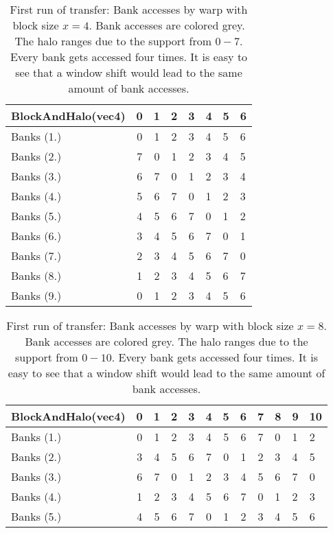 \documentclass[m,times]{cgMA}
\begin{document}
\begin{appendices}
\begin{table}[htpb]
  \begin{tabular}{ | l | a | a | a | a | l | l | l |}\hline
    BlockAndHalo(vec4) & 0 & 1 & 2 & 3 & 4 & 5 & 6 \\\hline
    Banks (1.) & 0 & 1 & 2 & 3 & 4 & 5 & 6 \\\hline
    Banks (2.) & 7 & 0 & 1 & 2 & 3 & 4 & 5 \\\hline
    Banks (3.) & 6 & 7 & 0 & 1 & 2 & 3 & 4 \\\hline
    Banks (4.) & 5 & 6 & 7 & 0 & 1 & 2 & 3 \\\hline
    Banks (5.) & 4 & 5 & 6 & 7 & 0 & 1 & 2 \\\hline
    Banks (6.) & 3 & 4 & 5 & 6 & 7 & 0 & 1 \\\hline
    Banks (7.) & 2 & 3 & 4 & 5 & 6 & 7 & 0 \\\hline
    Banks (8.) & 1 & 2 & 3 & 4 & 5 & 6 & 7 \\\hline
    Banks (9.) & 0 & 1 & 2 & 3 & 4 & 5 & 6 \\\hline
  \end{tabular}
  \caption{First run of transfer: Bank accesses by warp with block size $x=4$. Bank accesses are colored grey. The halo ranges due to the support from $0-7$. Every bank gets accessed four times. It is easy to see that a window shift would lead to the same amount of bank accesses.}
\end{table}
\begin{table}[htpb]
  \begin{tabular}{ | l | a | a | a | a | a | a | a |a | l | l | l |}\hline
    BlockAndHalo(vec4) & 0 & 1 & 2 & 3 & 4 & 5 & 6 & 7 & 8 & 9 & 10 \\\hline
    Banks (1.) & 0 & 1 & 2 & 3 & 4 & 5 & 6 & 7 & 0 & 1 & 2  \\\hline
    Banks (2.) & 3 & 4 & 5 & 6 & 7 & 0 & 1 & 2 & 3 & 4 & 5  \\\hline
    Banks (3.) & 6 & 7 & 0 & 1 & 2 & 3 & 4 & 5 & 6 & 7 & 0  \\\hline
    Banks (4.) & 1 & 2 & 3 & 4 & 5 & 6 & 7 & 0 & 1 & 2 & 3  \\\hline
    Banks (5.) & 4 & 5 & 6 & 7 & 0 & 1 & 2 & 3 & 4 & 5 & 6  \\\hline
  \end{tabular}
  \caption{First run of transfer: Bank accesses by warp with block size $x=8$. Bank accesses are colored grey. The halo ranges due to the support from $0-10$. Every bank gets accessed four times. It is easy to see that a window shift would lead to the same amount of bank accesses.}
\end{table}
\end{appendices}
\clearpage
\listoffigures
\listoftables
\lstlistoflistings
\clearpage
{}
\printbibliography
\end{document}
